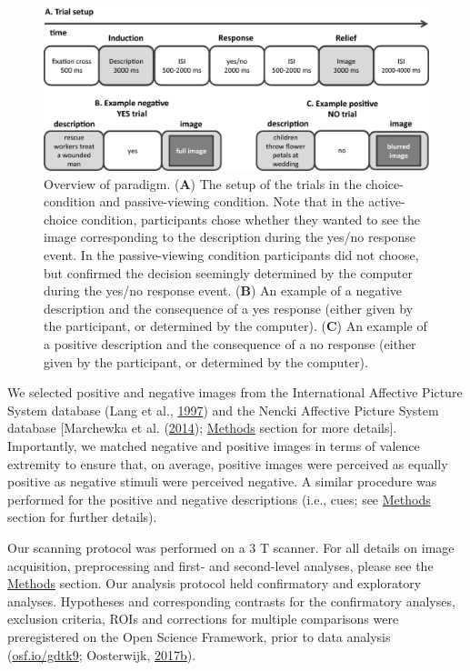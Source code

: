 \documentclass[11pt,american,]{memoir} %
\begin{document}
\begin{figure}
\centering
\includegraphics{_bookdown_files/morbid-curiosity-files/figures/figure_1.pdf}
\caption{\label{fig:fig-morbid-curiosity-1}Overview of paradigm. (\textbf{A}) The setup of the trials in the choice-condition and passive-viewing condition. Note that in the active-choice condition, participants chose whether they wanted to see the image corresponding to the description during the yes/no response event. In the passive-viewing condition participants did not choose, but confirmed the decision seemingly determined by the computer during the yes/no response event. (\textbf{B}) An example of a negative description and the consequence of a yes response (either given by the participant, or determined by the computer). (\textbf{C}) An example of a positive description and the consequence of a no response (either given by the participant, or determined by the computer).}
\end{figure}



We selected positive and negative images from the International Affective Picture System database (Lang et al., \protect\hyperlink{ref-lang1997international}{1997}) and the Nencki Affective Picture System database {[}Marchewka et al. (\protect\hyperlink{ref-marchewka2014nencki}{2014}); \protect\hyperlink{morbid-curiosity-methods}{Methods} section for more details{]}. Importantly, we matched negative and positive images in terms of valence extremity to ensure that, on average, positive images were perceived as equally positive as negative stimuli were perceived negative. A similar procedure was performed for the positive and negative descriptions (i.e., cues; see \protect\hyperlink{morbid-curiosity-methods}{Methods} section for further details).

Our scanning protocol was performed on a 3 T scanner. For all details on image acquisition, preprocessing and first- and second-level analyses, please see the \protect\hyperlink{morbid-curiosity-methods}{Methods} section. Our analysis protocol held confirmatory and exploratory analyses. Hypotheses and corresponding contrasts for the confirmatory analyses, exclusion criteria, ROIs and corrections for multiple comparisons were preregistered on the Open Science Framework, prior to data analysis (\url{osf.io/gdtk9}; Oosterwijk, \protect\hyperlink{ref-oosterwijk2017prereg}{2017}\protect\hyperlink{ref-oosterwijk2017prereg}{b}).
\end{document}
